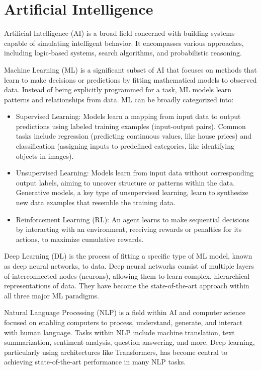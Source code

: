 \documentclass[../main.tex]{subfiles}
\begin{document}
\section{Artificial Intelligence}

Artificial Intelligence (AI) is a broad field concerned with building systems capable of simulating intelligent behavior. It encompasses various approaches, including logic-based systems, search algorithms, and probabilistic reasoning. 

Machine Learning (ML) is a significant subset of AI that focuses on methods that learn to make decisions or predictions by fitting mathematical models to observed data. Instead of being explicitly programmed for a task, ML models learn patterns and relationships from data. ML can be broadly categorized into: 

\begin{itemize}
    \item Supervised Learning: Models learn a mapping from input data to output predictions using labeled training examples (input-output pairs). Common tasks include regression (predicting continuous values, like house prices)  and classification (assigning inputs to predefined categories, like identifying objects in images).

    \item Unsupervised Learning: Models learn from input data without corresponding output labels, aiming to uncover structure or patterns within the data. Generative models, a key type of unsupervised learning, learn to synthesize new data examples that resemble the training data.
    
    \item Reinforcement Learning (RL): An agent learns to make sequential decisions by interacting with an environment, receiving rewards or penalties for its actions, to maximize cumulative rewards.
    
\end{itemize}

 Deep Learning (DL) is the process of fitting a specific type of ML model, known as deep neural networks, to data. Deep neural networks consist of multiple layers of interconnected nodes (neurons), allowing them to learn complex, hierarchical representations of data. They have become the state-of-the-art approach within all three major ML paradigms.

Natural Language Processing (NLP) is a field within AI and computer science focused on enabling computers to process, understand, generate, and interact with human language. Tasks within NLP include machine translation, text summarization, sentiment analysis, question answering, and more. Deep learning, particularly using architectures like Transformers, has become central to achieving state-of-the-art performance in many NLP tasks.
\end{document}

